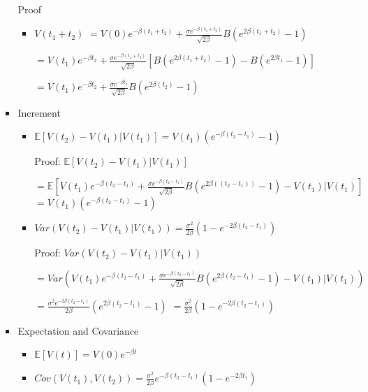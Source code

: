 \documentclass[a4paper]{article}
\begin{document}
\begin{itemize}
\begin{itemize}
\begin{itemize}
                        Proof
                        \begin{itemize}
                            \item $V(t_1 + t_2)$
                                $= V(0) e^{-\beta (t_1 + t_2)} + \frac{\sigma e^{-\beta (t_1 + t_2)}}{\sqrt{2\beta }} B(e^{2\beta (t_1 + t_2)} - 1)$

                                $= V(t_1) e^{-\beta t_2} + \frac{\sigma e^{-\beta (t_1 + t_2)}}{\sqrt{2\beta }} [B(e^{2\beta (t_1+t_2)} - 1) - B(e^{2\beta t_1} - 1)]$

                                $= V(t_1) e^{-\beta t_2} + \frac{\sigma e^{-\beta t_2}}{\sqrt{2\beta }} B(e^{2\beta (t_2)} - 1)$
                        \end{itemize}
                    \item Increment
                        \begin{itemize}
                            \item $\mathbb{E}[V(t_2) - V(t_1)|V(t_1)] = V(t_1) (e^{-\beta (t_2 - t_1)} - 1)$

                                Proof: $\mathbb{E}[V(t_2) - V(t_1)|V(t_1)]$

                                $= \mathbb{E}[V(t_1) e^{-\beta (t_2 - t_1)} + \frac{\sigma e^{-\beta (t_2 - t_1)}}{\sqrt{2\beta }} B(e^{2\beta ((t_2 - t_1))} - 1) - V(t_1) | V(t_1)]$
                                $= V(t_1) (e^{-\beta (t_2 - t_1)} - 1)$
                            \item $\mathit{Var}(V(t_2) - V(t_1)|V(t_1)) = \frac{\sigma^2}{2\beta} (1 - e^{-2\beta (t_2 - t_1)})$

                                Proof: $\mathit{Var}(V(t_2) - V(t_1)|V(t_1))$

                                $= \mathit{Var}(V(t_1) e^{-\beta (t_2 - t_1)} + \frac{\sigma e^{-\beta (t_2 - t_1)}}{\sqrt{2\beta }} B(e^{2\beta (t_2 - t_1)} - 1) - V(t_1) | V(t_1))$

                                $= \frac{\sigma^2 e^{-2\beta (t_2 - t_1)}}{2\beta} (e^{2\beta (t_2 - t_1)} - 1)$
                                $= \frac{\sigma^2}{2\beta} (1 - e^{-2\beta (t_2 - t_1)})$
                        \end{itemize}
                    \item Expectation and Covariance
                        \begin{itemize}
                            \item $\mathbb{E}[V(t)] = V(0)e^{-\beta t}$
                            \item $\mathit{Cov}(V(t_1), V(t_2)) = \frac{\sigma^2}{2\beta} e^{-\beta(t_2 - t_1)} (1 - e^{-2\beta t_1})$


\end{itemize}
\end{itemize}
\end{itemize}
\end{itemize}
\end{document}
